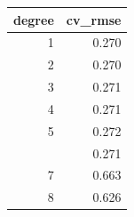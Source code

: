
\begin{tabular}{rr}
\toprule
degree & cv\_rmse\\
\midrule
1 & 0.270\\
2 & 0.270\\
3 & 0.271\\
4 & 0.271\\
5 & 0.272\\
\addlinespace
6 & 0.271\\
7 & 0.663\\
8 & 0.626\\
\bottomrule
\end{tabular}
